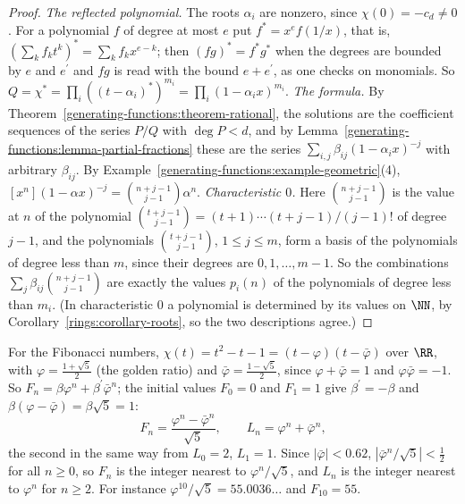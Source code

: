 \begin{proof}
\emph{The reflected polynomial.} The roots $\alpha_i$ are nonzero, since $\chi(0) = -c_d \neq 0$. For a polynomial $f$ of degree at most $e$ put $f^{\ast} = x^ef(1/x)$, that is,
$(\sum_kf_kt^k)^{\ast} = \sum_kf_kx^{e-k}$; then $(fg)^{\ast} = f^{\ast}g^{\ast}$ when the degrees are bounded by $e$ and $e^{\prime}$ and $fg$ is read with the bound $e + e^{\prime}$, as one checks on
monomials. So $Q = \chi^{\ast} = \prod_i((t - \alpha_i)^{\ast})^{m_i} = \prod_i(1 - \alpha_ix)^{m_i}$.
\emph{The formula.} By Theorem~\ref{generating-functions:theorem-rational}, the solutions are the coefficient sequences of the series $P/Q$ with $\deg P < d$, and by
Lemma~\ref{generating-functions:lemma-partial-fractions} these are the series $\sum_{i,j}\beta_{ij}(1 - \alpha_ix)^{-j}$ with arbitrary $\beta_{ij}$. By
Example~\ref{generating-functions:example-geometric}(4), $[x^n](1 - \alpha x)^{-j} = \binom{n + j - 1}{j - 1}\alpha^n$.
\emph{Characteristic $0$.} Here $\binom{n + j - 1}{j - 1}$ is the value at $n$ of the polynomial $\binom{t + j - 1}{j - 1} = (t + 1) \cdots (t + j - 1)/(j - 1)!$ of degree $j - 1$, and the polynomials
$\binom{t + j - 1}{j - 1}$, $1 \leq j \leq m$, form a basis of the polynomials of degree less than $m$, since their degrees are $0, 1, \ldots, m - 1$. So the combinations
$\sum_j\beta_{ij}\binom{n + j - 1}{j - 1}$ are exactly the values $p_i(n)$ of the polynomials of degree less than $m_i$. (In characteristic $0$ a polynomial is determined by its values on $\NN$,
by Corollary~\ref{rings:corollary-roots}, so the two descriptions agree.)
\end{proof}

\begin{example}\label{generating-functions:example-binet}
For the Fibonacci numbers, $\chi(t) = t^2 - t - 1 = (t - \varphi)(t - \bar{\varphi})$ over $\RR$, with $\varphi = \frac{1 + \sqrt 5}{2}$ (the golden ratio) and $\bar{\varphi} = \frac{1 - \sqrt 5}{2}$,
since $\varphi + \bar{\varphi} = 1$ and $\varphi\bar{\varphi} = -1$. So $F_n = \beta\varphi^n + \beta^{\prime}\bar{\varphi}^n$; the initial values $F_0 = 0$ and $F_1 = 1$ give $\beta^{\prime} = -\beta$ and
$\beta(\varphi - \bar{\varphi}) = \beta\sqrt 5 = 1$:
\[
F_n = \frac{\varphi^n - \bar{\varphi}^n}{\sqrt 5}, \qquad L_n = \varphi^n + \bar{\varphi}^n,
\]
the second in the same way from $L_0 = 2$, $L_1 = 1$. Since $|\bar{\varphi}| < 0.62$, $|\bar{\varphi}^n/\sqrt 5| < \frac12$ for all $n \geq 0$, so $F_n$ is the integer nearest to $\varphi^n/\sqrt 5$, and
$L_n$ is the integer nearest to $\varphi^n$ for $n \geq 2$. For instance $\varphi^{10}/\sqrt 5 = 55.0036\ldots$ and $F_{10} = 55$.
\end{example}

